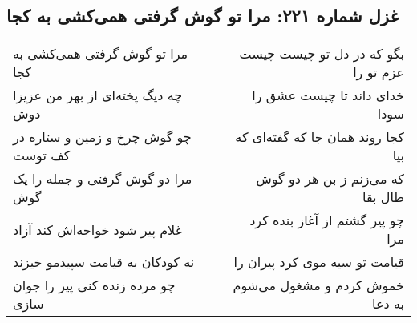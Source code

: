 \begin{center}
\section*{غزل شماره ۲۲۱: مرا تو گوش گرفتی همی‌کشی به کجا}
\label{sec:0221}
\begin{longtable}{l p{0.5cm} r}
مرا تو گوش گرفتی همی‌کشی به کجا
&&
بگو که در دل تو چیست چیست عزم تو را
\\
چه دیگ پخته‌ای از بهر من عزیزا دوش
&&
خدای داند تا چیست عشق را سودا
\\
چو گوش چرخ و زمین و ستاره در کف توست
&&
کجا روند همان جا که گفته‌ای که بیا
\\
مرا دو گوش گرفتی و جمله را یک گوش
&&
که می‌زنم ز بن هر دو گوش طال بقا
\\
غلام پیر شود خواجه‌اش کند آزاد
&&
چو پیر گشتم از آغاز بنده کرد مرا
\\
نه کودکان به قیامت سپیدمو خیزند
&&
قیامت تو سیه موی کرد پیران را
\\
چو مرده زنده کنی پیر را جوان سازی
&&
خموش کردم و مشغول می‌شوم به دعا
\\
\end{longtable}
\end{center}
